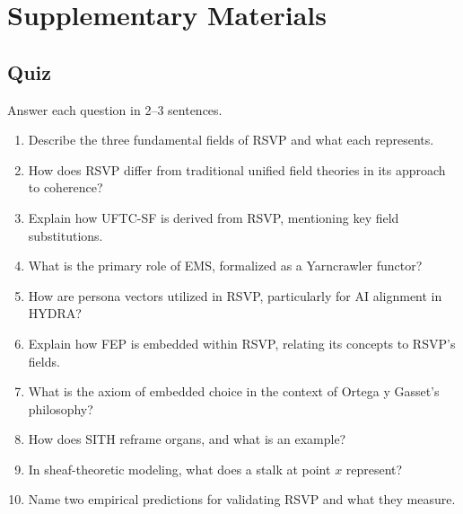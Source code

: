 \documentclass[12pt]{report}
\begin{document}
{{{{{{{{{{{{\part{Supplementary Materials}

\chapter{Quiz}
Answer each question in 2–3 sentences.
\begin{enumerate}
    \item Describe the three fundamental fields of RSVP and what each represents.
    \item How does RSVP differ from traditional unified field theories in its approach to coherence?
    \item Explain how UFTC-SF is derived from RSVP, mentioning key field substitutions.
    \item What is the primary role of EMS, formalized as a Yarncrawler functor?
    \item How are persona vectors utilized in RSVP, particularly for AI alignment in HYDRA?
    \item Explain how FEP is embedded within RSVP, relating its concepts to RSVP’s fields.
    \item What is the axiom of embedded choice in the context of Ortega y Gasset’s philosophy?
    \item How does SITH reframe organs, and what is an example?
    \item In sheaf-theoretic modeling, what does a stalk at point \(x\) represent?
    \item Name two empirical predictions for validating RSVP and what they measure.
\end{enumerate}

}}}}}}}}}}}}
\end{document}
